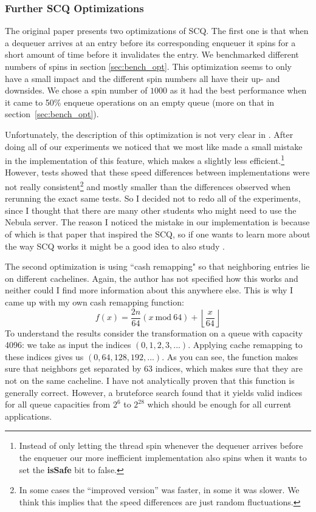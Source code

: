 \documentclass{article}      %
\begin{document}
\subsubsection{Further SCQ Optimizations}
\label{sec:scq_optimizations}
The original paper presents two optimizations of SCQ. The first one is that when a dequeuer arrives at an entry before its corresponding enqueuer it spins for a short amount of time before it invalidates the entry. We benchmarked different numbers of spins in section \ref{sec:bench_opt}. This optimization seems to only have a small impact and the different spin numbers all have their up- and downsides. We chose a spin number of $1000$ as it had the best performance when it came to 50\% enqueue operations on an empty queue (more on that in section~\ref{sec:bench_opt}).

Unfortunately, the description of this optimization is not very clear in \cite{nikolaev2019scalable}. After doing all of our experiments we noticed that we most like made a small mistake in the implementation of this feature, which makes a slightly less efficient.\footnote{Instead of only letting the thread spin whenever the dequeuer arrives before the enqueuer our more inefficient implementation also spins when it wants to set the \textbf{isSafe} bit to false.} However, tests showed that these speed differences between implementations were not really consistent\footnote{In some cases the ``improved version'' was faster, in some it was slower. We think this implies that the speed differences are just random fluctuations.} and mostly smaller than the differences observed when rerunning the exact same tests. So I decided not to redo all of the experiments, since I thought that there are many other students who might need to use the Nebula server. The reason I noticed the mistake in our implementation is because of \cite{10.1145/2517327.2442527} which is that paper that inspired the SCQ, so if one wants to learn more about the way SCQ works it might be a good idea to also study \cite{10.1145/2517327.2442527}.

The second optimization is using ``cash remapping" so that neighboring entries lie on different cachelines. Again, the author has not specified how this works and neither could I find more information about this anywhere else. This is why I came up with my own cash remapping function:
\begin{equation}
	f(x) = \frac{2n}{64}(x \ \mathrm{mod} \ 64) + \left\lfloor \frac{x}{64} \right\rfloor
\end{equation}
To understand the results consider the transformation on a queue with capacity 4096: we take as input the indices $(0,1,2,3,...)$. Applying cache remapping to these indices gives us $(0,64,128,192,...)$. As you can see, the function makes sure that neighbors get separated by 63 indices, which makes sure that they are not on the same cacheline. I have not analytically proven that this function is generally correct. However, a bruteforce search found that it yields valid indices for all queue capacities from $2^6$ to $2^{28}$ which should be enough for all current applications.
\end{document}
